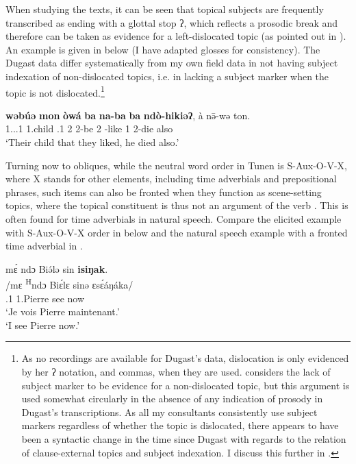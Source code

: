 \documentclass[output=paper,colorlinks,citecolor=brown
]{langscibook}
\begin{document}
When studying the \citet{Dugast1975} texts, it can be seen that topical subjects are frequently transcribed as ending with a glottal stop ʔ, which reflects a prosodic break and therefore can be taken as evidence for a left-dislocated topic (as pointed out in \citealt[59]{Isaac2007}). An example is given in  below (I have adapted glosses for consistency). The Dugast data differ systematically from my own field data in not having subject indexation of non-dislocated topics, i.e. in lacking a subject marker when the topic is not dislocated.\footnote{As no recordings are available for Dugast's data, dislocation is only evidenced by her ʔ notation, and commas, when they are used. \citet{Isaac2007} considers the lack of subject marker to be evidence for a non-dislocated topic, but this argument is used somewhat circularly in the absence of any indication of prosody in Dugast's transcriptions. As all my consultants consistently use subject markers regardless of whether the topic is dislocated, there appears to have been a syntactic change in the time since Dugast with regards to the relation of clause-external topics and subject indexation. I discuss this further in \citet[363--365]{KerrFut}.}

\ea
\label{dugasttopic}
\gll \textbf{wəbúə} \textbf{mon} \textbf{òwá} \textbf{ba} \textbf{na-ba} \textbf{ba} \textbf{ndò-hikiəʔ}, à nə̄-wə ton.\\
{\db}1.\PRO{}.\POSS{}.1{} 1.child \REL{}.1{} 2\SM{} \PST{}2-be 2\SM{} \PRS{}-like 1\SM{} \PST{}2-{}die also \\
\glt
`Their child that they liked, he died also.' 

\z

Turning now to obliques, while the neutral word order in Tunen is S-Aux-O-V-X, where X stands for other elements, including time adverbials and prepositional phrases, such items can also be fronted when they function as scene-setting topics, where the topical constituent is thus not an argument of the verb \citep{Lambrecht1994}. This is often found for time adverbials in natural speech. Compare the elicited example with S-Aux-O-V-X order in  below and the natural speech example with a fronted time adverbial in .

\ea
\label{seePierrenow}
\glll
{\db}mɛ́ ndɔ Biə́lə sin \textbf{isiŋak}. \\
/mɛ \textsuperscript{H}ndɔ Biɛ́lɛ sinə ɛsɛ́áŋáka/ \\
{\db}\SM{}.1\SG{} \PRS{} 1.Pierre see now \\
\glt
`Je vois Pierre maintenant.' \\ `I see Pierre now.' \jambox*{[EO 1412] }
\end{document}
